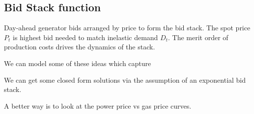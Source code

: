 \subsection{Bid Stack function}
Day-ahead generator bids arranged by price to form the bid stack. The spot price $P_t$ is highest bid needed to match inelastic demand $D_t$. The merit order of production costs drives the dynamics of the stack.

We can model some of these ideas which capture

We can get some closed form solutions via the assumption of an exponential bid stack.

A better way is to look at the power price vs gas price curves.



























